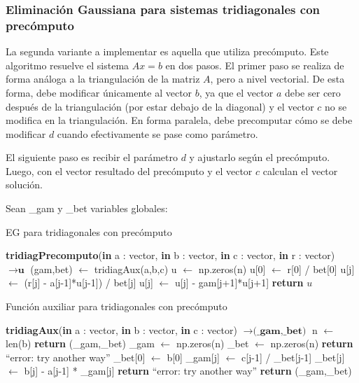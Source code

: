 \subsubsection{Eliminación Gaussiana para sistemas tridiagonales con precómputo}

La segunda variante a implementar es aquella que utiliza precómputo. Este algoritmo resuelve el sistema $Ax = b$ en dos pasos. 
El primer paso se realiza de forma análoga a la triangulación de la matriz $A$, pero a nivel vectorial. De esta forma, debe modificar únicamente al vector $b$, ya que el vector $a$ debe ser cero después de la triangulación (por estar debajo de la diagonal) y el vector $c$ no se modifica en la triangulación. En forma paralela, debe precomputar cómo se debe modificar $d$ cuando efectivamente se pase como parámetro.

El siguiente paso es recibir el parámetro $d$ y ajustarlo según el precómputo. Luego, con el vector resultado del precómputo y el vector $c$ calculan el vector solución.

Sean \_gam y \_bet variables globales:

\begin{algorithm}[H]
\caption{EG para tridiagonales con precómputo}\label{tridiagonal_prec}
\begin{algorithmic}
\State \textbf{tridiagPrecomputo}(\textbf{in} a : vector, \textbf{in} b : vector, \textbf{in} c : vector, \textbf{in} r : vector) $\to \textbf{u}$
\State (gam,bet) $\gets$ tridiagAux(a,b,c)
\State u $\gets$ np.zeros(n)
\State u[0] $\gets$ r[0] / bet[0]
    \State u[j] $\gets$ (r[j] - a[j-1]*u[j-1]) / bet[j]
\EndFor
{}
    \State u[j] $\gets$ u[j] -  gam[j+1]*u[j+1]
\EndFor
\State \textbf{return} $u$
\end{algorithmic}
\end{algorithm}

\begin{algorithm}[H]
\caption{Función auxiliar para tridiagonales con precómputo}
\begin{algorithmic}
\State \textbf{tridiagAux}(\textbf{in} a : vector, \textbf{in} b : vector, \textbf{in} c : vector) $\to \textbf{(\_gam,\_bet)}$
\State n $\gets$ len(b)
    \State \textbf{return} (\_gam,\_bet)
\EndIf
\State \_gam $\gets$ np.zeros(n)
\State \_bet $\gets$ np.zeros(n)
    \State \textbf{return} ``error: try another way''
\EndIf
\State \_bet[0] $\gets$ b[0]
    \State \_gam[j] $\gets$ c[j-1] / \_bet[j-1]
    \State \_bet[j] $\gets$ b[j] - a[j-1] * \_gam[j]
        \State \textbf{return} ``error: try another way''
    \EndIf
\EndFor
\State \textbf{return} (\_gam,\_bet)
\end{algorithmic}
\end{algorithm}





